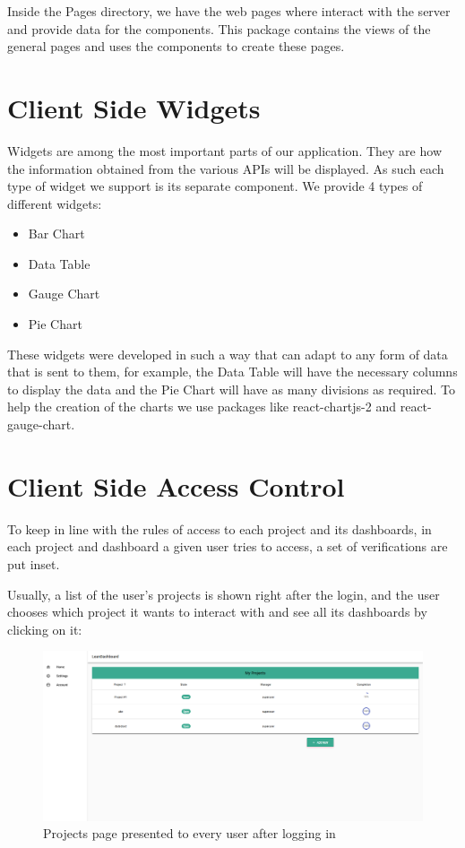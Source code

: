 \documentclass[a4paper,twoside,10pt]{report}
\begin{document}
Inside the Pages directory, we have the web pages where interact with the server and provide data for the components. This package contains the views of the general pages and uses the components to create these pages. 
\newpage

\section{Client Side Widgets}

Widgets are among the most important parts of our application. They are how the information obtained from the various APIs will be displayed.
\newline
As such each type of widget we support is its separate component. 
\newline
We provide 4 types of different widgets:
 \begin{itemize}
	\item Bar Chart
	\item Data Table
	\item Gauge Chart
	\item Pie Chart
\end{itemize}
These widgets were developed in such a way that can adapt to any form of data that is sent to them, for example, the Data Table will have the necessary columns to display the data and the Pie Chart will have as many divisions as required. To help the creation of the charts we use packages like react-chartjs-2 and react-gauge-chart. 

\section{Client Side Access Control}
To keep in line with the rules of access to each project and its dashboards, in each project and dashboard a given user tries to access, a set of verifications are put inset.

Usually, a list of the user's projects is shown right after the login, and the user chooses which project it wants to interact with and see all its dashboards by clicking on it:
\begin{figure}[h!]
\center
  \includegraphics[width=\textwidth]{projectsPage.png}
\caption{Projects page presented to every user after logging in}
\end{figure}
\end{document}
